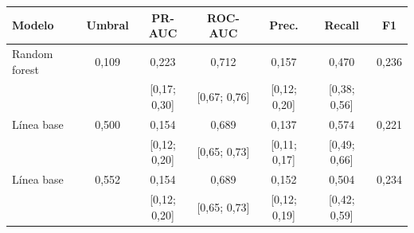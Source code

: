 \begin{tabular}{@{}lcccccc@{}}
\toprule
Modelo & Umbral & PR-AUC & ROC-AUC & Prec. & Recall & F1 \\
\midrule
Random forest & 0,109 & 0,223 & 0,712 & 0,157 & 0,470 & 0,236 \\
 & & [0,17; 0,30] & [0,67; 0,76] & [0,12; 0,20] & [0,38; 0,56] & \\
\midrule
Línea base & 0,500 & 0,154 & 0,689 & 0,137 & 0,574 & 0,221 \\
 & & [0,12; 0,20] & [0,65; 0,73] & [0,11; 0,17] & [0,49; 0,66] & \\
\midrule
Línea base & 0,552 & 0,154 & 0,689 & 0,152 & 0,504 & 0,234 \\
 & & [0,12; 0,20] & [0,65; 0,73] & [0,12; 0,19] & [0,42; 0,59] & \\
\bottomrule
\end{tabular}
